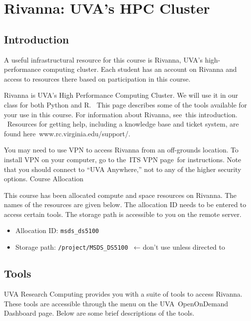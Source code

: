 \documentclass[
  letterpaper,
  DIV=11,
  numbers=noendperiod]{scrreport}
\providecommand{\tightlist}{%
  \setlength{\itemsep}{0pt}\setlength{\parskip}{0pt}}\usepackage{longtable,booktabs,array}
\begin{document}
\hypertarget{rivanna-uvas-hpc-cluster}{%
\chapter{Rivanna: UVA's HPC Cluster}\label{rivanna-uvas-hpc-cluster}}

\hypertarget{introduction}{%
\section{Introduction}\label{introduction}}

A useful infrastructural resource for this course is Rivanna, UVA's
high-performance computing cluster. Each student has an account on
Rivanna and access to resources there based on participation in this
course.

Rivanna is UVA's High Performance Computing Cluster. We will use it in
our class for both Python and R.~ This page describes some of the tools
available for your use in this course. For information about Rivanna,
see~this introduction. ~Resources for getting help, including a
knowledge base and ticket system, are found
here~www.rc.virginia.edu/support/.

You may need to use VPN to access Rivanna from an off-grounds location.
To install VPN on your computer, go to the~ITS VPN page~for
instructions. Note that you should connect to ``UVA Anywhere,'' not to
any of the higher security options. Course Allocation

This course has been allocated compute and space resources on Rivanna.
The names of the resources are given below. The allocation ID needs to
be entered to access certain tools. The storage path is accessible to
you on the remote server.

\begin{itemize}
\tightlist
\item
  Allocation ID: \texttt{msds\_ds5100}
\item
  Storage path: \texttt{/project/MSDS\_DS5100}~ ← don't use unless
  directed to
\end{itemize}

\hypertarget{tools}{%
\section{Tools~}\label{tools}}

UVA Research Computing provides you with a suite of tools to access
Rivanna. These tools are accessible through the menu on the
UVA~OpenOnDemand Dashboard page. Below are some brief descriptions of
the tools.
\end{document}
